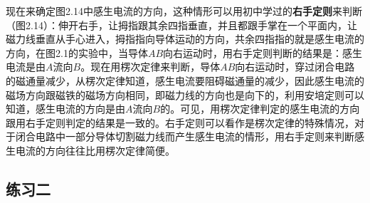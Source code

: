 现在来确定图2.14中感生电流的方向，这种情形可以用初中学过的\textbf{右手定则}来判断（图2.14）：伸开右手，让拇指跟其余四指垂直，并且都跟手掌在一个平面内，让磁力线垂直从手心进入，拇指指向导体运动的方向，共余四指指的就是感生电流的方向，在图2.1的实验中，当导体$AB$向右运动时，用右手定则判断的结果是：感生电流是由$A$流向$B$。现在用楞次定律来判断，导体$AB$向右运动时，穿过闭合电路的磁通量减少，从楞次定律知道，感生电流要阻碍磁通量的减少，因此感生电流的磁场方向跟磁铁的磁场方向相同，即磁力线的方向也是向下的，利用安培定则可以知道，感生电流的方向是由$A$流向$B$的。可见，用楞次定律判定的感生电流的方向跟用右手定则判定的结果是一致的。右手定则可以看作是楞次定律的特殊情况，对于闭合电路中一部分导体切割磁力线而产生感生电流的情形，用右手定则来判断感生电流的方向往往比用楞次定律简便。

\subsection*{练习二}

